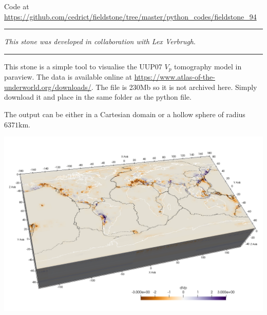 

\begin{center}
Code at \url{https://github.com/cedrict/fieldstone/tree/master/python_codes/fieldstone_94}
\end{center}

\par\noindent\rule{\textwidth}{0.4pt}

{\sl This stone was developed in collaboration with Lex Verbrugh}. 

\par\noindent\rule{\textwidth}{0.4pt}


This stone is a simple tool to visualise the UUP07 $V_p$ tomography model \cite{hasp15} in paraview. 
The data is available online at \url{https://www.atlas-of-the-underworld.org/downloads/}.
The file is 230Mb so it is not archived here. 
Simply download it and place in the same folder as the python file. 

The output can be either in a Cartesian domain or a hollow sphere of radius $6371\si{\kilo\metre}$.

\begin{center}
\includegraphics[width=14cm]{python_codes/fieldstone_94/map} 
\end{center}


